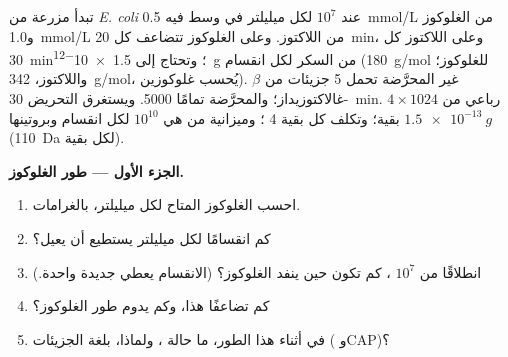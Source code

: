 \begin{problem}
\label{pb:b1:expression-control:1}
تبدأ مزرعة من \emph{E. coli} عند $10^7$  لكل ميليلتر في وسط
فيه \qty{0.5}{mmol/L} من الغلوكوز و\qty{1.0}{mmol/L} من اللاكتوز.
وعلى الغلوكوز تتضاعف  كل \qty{20}{min}، وعلى اللاكتوز كل
\qty{30}{min}؛ وتحتاج  إلى \qty{1.5e-12}{g} من السكر لكل
انقسام (\qty{180}{g/mol} للغلوكوز؛ واللاكتوز، \qty{342}{g/mol}،
يُحسب غلوكوزين).  غير المحرَّضة تحمل 5 جزيئات من
$\beta$-غالاكتوزيداز؛ والمحرَّضة تمامًا \num{5000}. ويستغرق
التحريض \qty{30}{min}.  رباعي من $4\times 1024$ بقية؛
وتكلف كل بقية 4 ؛ وميزانية  من  هي $10^{10}$ لكل
انقسام وبروتينها $\qty{1.5e-13}{g}$ (\qty{110}{Da} لكل بقية).

\medskip
\noindent\textbf{الجزء الأول --- طور الغلوكوز.}
\begin{enumerate}
  \item احسب الغلوكوز المتاح لكل ميليلتر، بالغرامات.
  \item كم انقسامًا لكل ميليلتر يستطيع أن يعيل؟
  \item انطلاقًا من $10^7$ ، كم  تكون حين ينفد الغلوكوز؟
        (الانقسام يعطي  جديدة واحدة.)
  \item كم تضاعفًا هذا، وكم يدوم طور الغلوكوز؟
  \item في أثناء هذا الطور، ما حالة ، ولماذا،
        بلغة الجزيئات ( وCAP)؟
\end{enumerate}


\end{problem}

